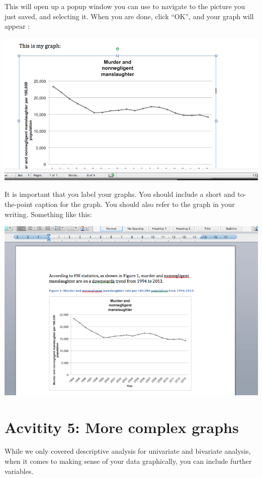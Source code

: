 \documentclass[]{book}
\theoremstyle{definition}
\theoremstyle{definition}
\theoremstyle{definition}
\theoremstyle{remark}
\begin{document}
This will open up a popup window you can use to navigate to the picture
you just saved, and selecting it. When you are done, click ``OK'', and
your graph will appear :

\includegraphics{imgs/inserted_graph.png}

It is important that you label your graphs. You should include a short
and to-the-point caption for the graph. You should also refer to the
graph in your writing. Something like this:

\includegraphics{imgs/ref_and_caption.png}

\hypertarget{acvitity-5-more-complex-graphs}{%
\section{Acvitity 5: More complex
graphs}\label{acvitity-5-more-complex-graphs}}

While we only covered descriptive analysis for univariate and bivariate
analysis, when it comes to making sense of your data graphically, you
can include further variables.
\end{document}
